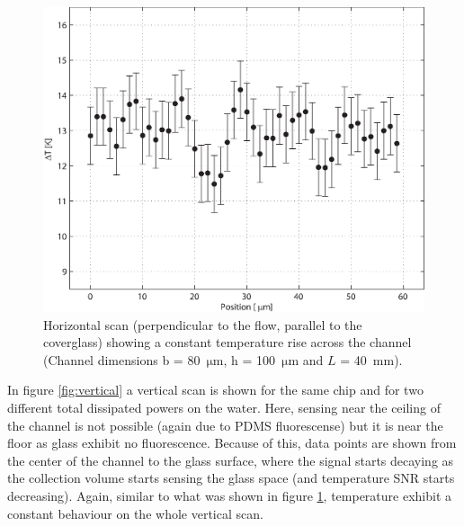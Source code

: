 \documentclass[twocolumn]{svjour3}       %
\begin{document}
\begin{figure}[h!]
\centering
\includegraphics[width=\columnwidth]{figs/horizontal.eps}
\caption{Horizontal scan (perpendicular to the flow, parallel to the coverglass) showing a constant temperature rise across the channel (Channel dimensions  b = 80~$\mathrm{\mu m}$, h = 100~$\mathrm{\mu m}$ and $L$ = 40~mm).\label{fig:horizontal}}
\end{figure}

In figure \ref{fig:vertical} a vertical scan is shown for the same chip and for two different total dissipated powers on the water. Here, sensing near the ceiling of the channel is not possible (again due to PDMS fluorescense) but it is near the floor as glass exhibit no fluorescence. Because of this, data points are shown from the center of the channel to the glass surface, where the signal starts decaying as the collection volume starts sensing the glass space (and temperature SNR starts decreasing). Again, similar to what was shown in figure \ref{fig:horizontal}, temperature exhibit a constant behaviour on the whole vertical scan.
\end{document}
